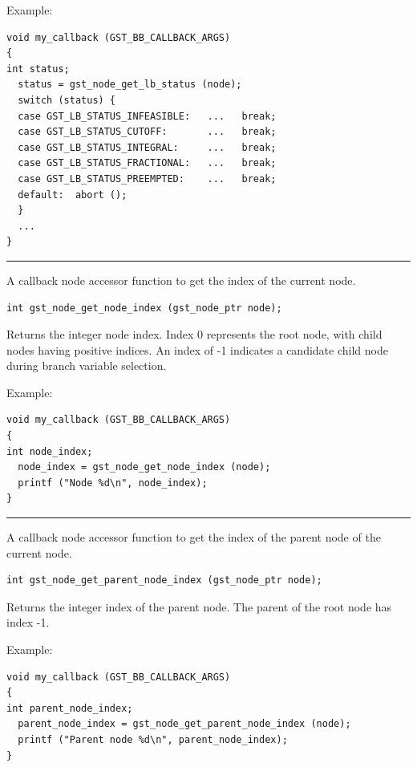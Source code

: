 \bigskip{}Example:
{\footnotesize
\begin{verbatim}
void my_callback (GST_BB_CALLBACK_ARGS)
{
int	status;
  status = gst_node_get_lb_status (node);
  switch (status) {
  case GST_LB_STATUS_INFEASIBLE:   ...   break;
  case GST_LB_STATUS_CUTOFF:       ...   break;
  case GST_LB_STATUS_INTEGRAL:     ...   break;
  case GST_LB_STATUS_FRACTIONAL:   ...   break;
  case GST_LB_STATUS_PREEMPTED:    ...   break;
  default:  abort ();
  }
  ...
}
\end{verbatim}
}
\clearpage{}
\label{gst_node_get_node_index}

\hrule
\vskip 0.25in
A callback node accessor function to get the index of the current node.

\begin{verbatim}
int gst_node_get_node_index (gst_node_ptr node);

\end{verbatim}
Returns the integer node index.  Index 0 represents the root node,
with child nodes having positive indices.  An index of -1 indicates
a candidate child node during branch variable selection.

\bigskip{}Example:
{\footnotesize
\begin{verbatim}
void my_callback (GST_BB_CALLBACK_ARGS)
{
int	node_index;
  node_index = gst_node_get_node_index (node);
  printf ("Node %d\n", node_index);
}
\end{verbatim}
}
\clearpage{}
\label{gst_node_get_parent_node_index}

\hrule
\vskip 0.25in
A callback node accessor function to get the index of the parent
node of the current node.

\begin{verbatim}
int gst_node_get_parent_node_index (gst_node_ptr node);

\end{verbatim}
Returns the integer index of the parent node.  The parent of the
root node has index -1.

\bigskip{}Example:
{\footnotesize
\begin{verbatim}
void my_callback (GST_BB_CALLBACK_ARGS)
{
int	parent_node_index;
  parent_node_index = gst_node_get_parent_node_index (node);
  printf ("Parent node %d\n", parent_node_index);
}
\end{verbatim}
}
\clearpage{}
\label{gst_node_get_node_depth}

